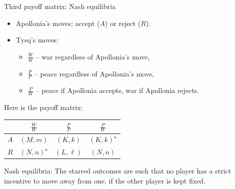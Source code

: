 \documentclass[compress]{beamer}
\begin{document}
\begin{frame}{Third payoff matrix: Nash equilibria}

\begin{itemize}
\item Apollonia's moves: accept ($A$) or reject ($R$).
\item Tysq's moves:
\begin{itemize}  
\item $\frac{W}{W}$ -- war regardless of Apollonia's move,
\item $\frac{P}{P}$ -- peace regardless of Apollonia's move,
\item $\frac{P}{W}$ -- peace if Apollonia accepts, war if Apollonia rejects.
\end{itemize}
\end{itemize}
Here is the payoff matrix:
\begin{center}
\begin{tabular}{c|ccc}
  & $\frac{W}{W}$  & $\frac{P}{P}$  & $\frac{P}{W}$ \\
\hline
$A$ & $(M,m)$      & $(K,k)$        & $(K,k)^\star$  \\
$R$ & $(N,n)^\star$ & $(L,\ell)$     & $(N,n)$  
\end{tabular}
\end{center}

\begin{block}{Nash equilibria:}
The starred outcomes are such that no player has a strict incentive to move away
from one, if the other player is kept fixed.
\end{block}  

\end{frame}
\end{document}
